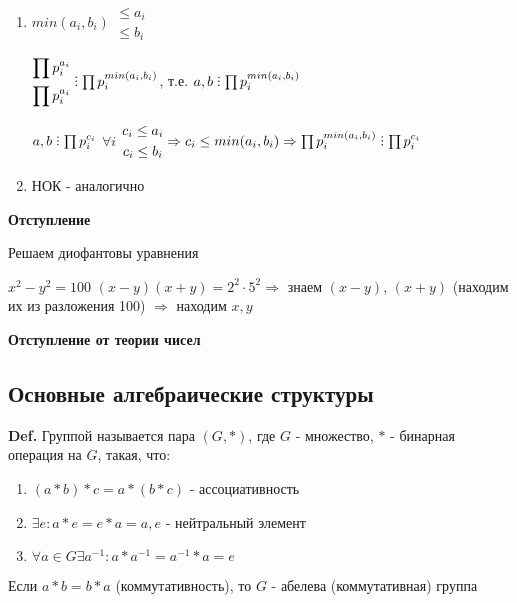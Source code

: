 \documentclass[14pt, letter paper]{article}
\def\divby{%
  \mathrel{\text{\vbox{\baselineskip.65ex\lineskiplimit0pt\hbox{.}\hbox{.}\hbox{.}}}}%
}
\begin{document}
\begin{enumerate}
    \item $min(a_i, b_i) \begin{gathered} \leq a_i \\ \leq b_i \end{gathered}$

    $\begin{gathered} \prod p_i^{a_i} \\ \prod p_i^{a_i} \end{gathered} \divby \prod p_i^{min(a_i, b_i)}$, т.е. $a, b \divby \prod p_i^{min(a_i, b_i)}$

    $a, b \divby \prod p_i^{c_i}$ $\forall i$ $\begin{gathered} c_i \leq a_i \\ c_i \leq b_i \end{gathered} \Rightarrow c_i \leq min(a_i, b_i) \Rightarrow \prod p_i^{min(a_i, b_i)} \divby \prod p_i^{c_i}$

    \item НОК - аналогично
\end{enumerate}

\textbf{Отступление}

Решаем диофантовы уравнения

$x^2 - y^2 = 100$ $(x-y)(x+y) = 2^2 \cdot 5^2 \Rightarrow$ знаем $(x - y)$, $(x + y)$ (находим их из разложения 100) $\Rightarrow$ находим $x, y$

\textbf{Отступление от теории чисел}

\begin{center}
    \section*{Основные алгебраические структуры}
\end{center}

\textbf{Def.} Группой называется пара $(G, *)$, где $G$ - множество, $*$ - бинарная операция на $G$, такая, что:
\begin{enumerate}
    \item $(a * b) * c = a * (b * c)$ - ассоциативность
    \item $\exists e: a * e = e * a = a, e$ - нейтральный элемент
    \item $\forall a \in G \exists a^{-1}: a * a^{-1} = a^{-1} * a = e$
\end{enumerate}

Если $a * b = b * a$ (коммутативность), то $G$ - абелева (коммутативная) группа
\end{document}
